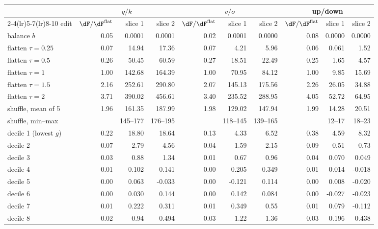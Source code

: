\begin{table}[H]
\centering\footnotesize
\setlength{\tabcolsep}{3pt}
\begin{tabular}{@{}l rrr rrr rrr@{}}
\toprule
& \multicolumn{3}{c}{$q/k$} & \multicolumn{3}{c}{$v/o$} & \multicolumn{3}{c}{up/down} \\
\cmidrule(lr){2-4}\cmidrule(lr){5-7}\cmidrule(lr){8-10}
edit & $\dF/\dF^{\mathrm{flat}}$ & slice 1 & slice 2 & $\dF/\dF^{\mathrm{flat}}$ & slice 1 & slice 2 & $\dF/\dF^{\mathrm{flat}}$ & slice 1 & slice 2 \\
\midrule
balance $b$ & 0.05 & 0.0001 & 0.0001 & 0.02 & 0.0001 & 0.0000 & 0.08 & 0.0000 & 0.0000 \\
\midrule
flatten $\tau=0.25$ & 0.07 & 14.94 & 17.36 & 0.07 & 4.21 & 5.96 & 0.06 & 0.061 & 1.52 \\
flatten $\tau=0.5$ & 0.26 & 50.45 & 60.59 & 0.27 & 18.51 & 22.49 & 0.25 & 1.65 & 4.57 \\
flatten $\tau=1$ & 1.00 & 142.68 & 164.39 & 1.00 & 70.95 & 84.12 & 1.00 & 9.85 & 15.69 \\
flatten $\tau=1.5$ & 2.16 & 252.61 & 290.80 & 2.07 & 145.13 & 175.56 & 2.26 & 26.05 & 34.88 \\
flatten $\tau=2$ & 3.71 & 390.02 & 456.61 & 3.40 & 235.52 & 288.95 & 4.05 & 52.72 & 64.95 \\
\midrule
shuffle, mean of 5 & 1.96 & 161.35 & 187.99 & 1.98 & 129.02 & 147.94 & 1.99 & 14.28 & 20.51 \\
shuffle, min--max &  & 145--177 & 176--195 &  & 118--145 & 139--165 &  & 12--17 & 18--23 \\
\midrule
decile 1 (lowest $g$) & 0.22 & 18.80 & 18.64 & 0.13 & 4.33 & 6.52 & 0.38 & 4.59 & 8.32 \\
decile 2 & 0.07 & 2.79 & 4.56 & 0.04 & 1.59 & 2.15 & 0.09 & 0.51 & 0.73 \\
decile 3 & 0.03 & 0.88 & 1.34 & 0.01 & 0.67 & 0.96 & 0.04 & 0.070 & 0.049 \\
decile 4 & 0.01 & 0.102 & 0.141 & 0.00 & 0.205 & 0.349 & 0.01 & 0.014 & -0.018 \\
decile 5 & 0.00 & 0.063 & -0.033 & 0.00 & -0.121 & 0.114 & 0.00 & 0.008 & -0.020 \\
decile 6 & 0.00 & 0.030 & 0.144 & 0.00 & 0.142 & 0.084 & 0.00 & -0.027 & -0.023 \\
decile 7 & 0.01 & 0.222 & 0.311 & 0.01 & 0.349 & 0.55 & 0.01 & 0.079 & -0.112 \\
decile 8 & 0.02 & 0.94 & 0.494 & 0.03 & 1.22 & 1.36 & 0.03 & 0.196 & 0.438 \\

\end{tabular}
\end{table}
